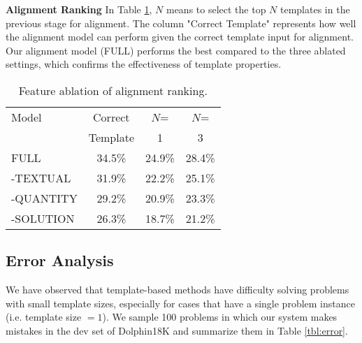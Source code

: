 \documentclass[11pt,letterpaper]{article}
\begin{document}
\textbf{Alignment Ranking} In Table \ref{tbl:alignablation}, $N$ means to select the top $N$ templates in the previous stage for alignment. The column "Correct Template" represents how well the alignment model can perform given the correct template input for alignment. Our alignment model (FULL) performs the best compared to the three ablated settings, which confirms the effectiveness of template properties.
\begin{table}[htb]
\begin{center}
	\begin{tabular}{l|c|c|c}
        \hline
		Model & Correct & $N$= & $N$=\\
                & Template & 1  &   3\\
        \hline
		FULL & 34.5\% & 24.9\% & 28.4\%\\
        \hline
		-TEXTUAL & 31.9\% & 22.2\% & 25.1\%\\
        \hline
		-QUANTITY & 29.2\% & 20.9\% & 23.3\%\\
        \hline
        -SOLUTION & 26.3\% & 18.7\% & 21.2\%\\
        \hline
	\end{tabular}
\end{center}
	\caption{Feature ablation of alignment ranking.}\label{tbl:alignablation}
\end{table}

\subsection{Error Analysis}
We have observed that template-based methods have difficulty solving problems with small template sizes, especially for cases that have a single problem instance (i.e. template size $=1$).
We sample 100 problems in which our system makes mistakes in the dev set of Dolphin18K and summarize them in Table \ref{tbl:error}.
\end{document}
